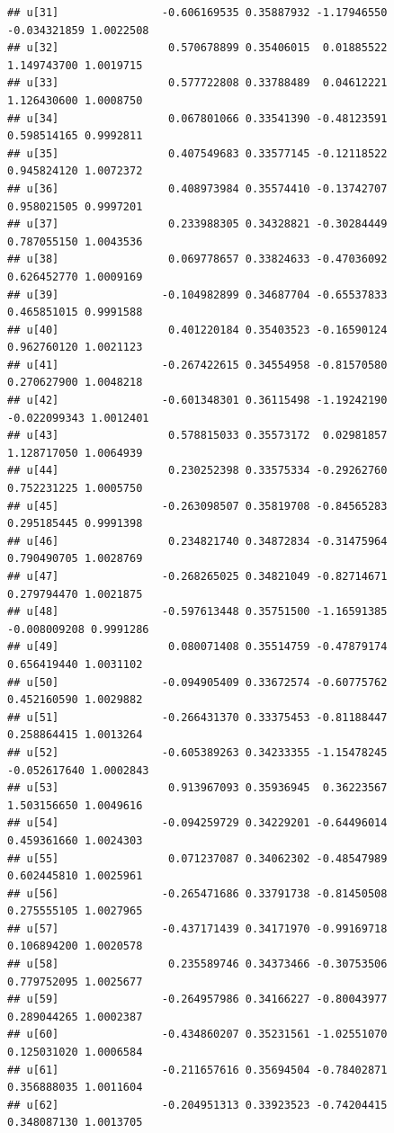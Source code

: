 \documentclass[
]{book}
\begin{document}
\begin{verbatim}
## u[31]                -0.606169535 0.35887932 -1.17946550 -0.034321859 1.0022508
## u[32]                 0.570678899 0.35406015  0.01885522  1.149743700 1.0019715
## u[33]                 0.577722808 0.33788489  0.04612221  1.126430600 1.0008750
## u[34]                 0.067801066 0.33541390 -0.48123591  0.598514165 0.9992811
## u[35]                 0.407549683 0.33577145 -0.12118522  0.945824120 1.0072372
## u[36]                 0.408973984 0.35574410 -0.13742707  0.958021505 0.9997201
## u[37]                 0.233988305 0.34328821 -0.30284449  0.787055150 1.0043536
## u[38]                 0.069778657 0.33824633 -0.47036092  0.626452770 1.0009169
## u[39]                -0.104982899 0.34687704 -0.65537833  0.465851015 0.9991588
## u[40]                 0.401220184 0.35403523 -0.16590124  0.962760120 1.0021123
## u[41]                -0.267422615 0.34554958 -0.81570580  0.270627900 1.0048218
## u[42]                -0.601348301 0.36115498 -1.19242190 -0.022099343 1.0012401
## u[43]                 0.578815033 0.35573172  0.02981857  1.128717050 1.0064939
## u[44]                 0.230252398 0.33575334 -0.29262760  0.752231225 1.0005750
## u[45]                -0.263098507 0.35819708 -0.84565283  0.295185445 0.9991398
## u[46]                 0.234821740 0.34872834 -0.31475964  0.790490705 1.0028769
## u[47]                -0.268265025 0.34821049 -0.82714671  0.279794470 1.0021875
## u[48]                -0.597613448 0.35751500 -1.16591385 -0.008009208 0.9991286
## u[49]                 0.080071408 0.35514759 -0.47879174  0.656419440 1.0031102
## u[50]                -0.094905409 0.33672574 -0.60775762  0.452160590 1.0029882
## u[51]                -0.266431370 0.33375453 -0.81188447  0.258864415 1.0013264
## u[52]                -0.605389263 0.34233355 -1.15478245 -0.052617640 1.0002843
## u[53]                 0.913967093 0.35936945  0.36223567  1.503156650 1.0049616
## u[54]                -0.094259729 0.34229201 -0.64496014  0.459361660 1.0024303
## u[55]                 0.071237087 0.34062302 -0.48547989  0.602445810 1.0025961
## u[56]                -0.265471686 0.33791738 -0.81450508  0.275555105 1.0027965
## u[57]                -0.437171439 0.34171970 -0.99169718  0.106894200 1.0020578
## u[58]                 0.235589746 0.34373466 -0.30753506  0.779752095 1.0025677
## u[59]                -0.264957986 0.34166227 -0.80043977  0.289044265 1.0002387
## u[60]                -0.434860207 0.35231561 -1.02551070  0.125031020 1.0006584
## u[61]                -0.211657616 0.35694504 -0.78402871  0.356888035 1.0011604
## u[62]                -0.204951313 0.33923523 -0.74204415  0.348087130 1.0013705

\end{verbatim}
\end{document}
